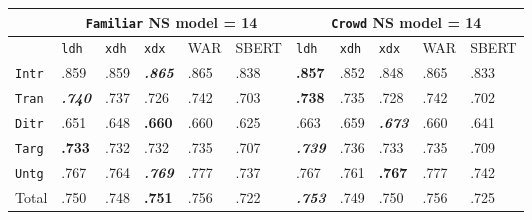 \documentclass[xcolor={dvipsnames}]{beamer}
\newcommand{\feat}[1]{\textsc{#1}}
\newcommand{\param}[1]{\texttt{#1}}
\begin{document}
\begin{frame}
\small
\begin{table}[htb!]
\begin{center}
\setlength{\tabcolsep}{.35em}
\begin{tabular}{|l||l|l|l||l|l||l|l|l||l|l|}
\hline
 & \multicolumn{5}{c||}{\param{Fam\-il\-iar} NS model = 14} & \multicolumn{5}{c|}{\param{Crowd} NS model = 14} \\
\hline
    		& \param{ldh}	& \param{xdh} &	\param{xdx} & WAR	& {\scriptsize SBERT} & \param{ldh}	& \param{xdh} &	\param{xdx} & WAR	& {\scriptsize SBERT} \\ \hline
\hline
\param{Intr}  & .859                   & .859 & \textit{\textbf{.865}} & .865 & .838 & \textbf{.857}          & .852 & .848                   & .865 & .833 \\ \hline
\param{Tran}  & \textit{\textbf{.740}} & .737 & .726                   & .742 & .703 & \textbf{.738}          & .735 & .728                   & .742 & .702 \\ \hline
\param{Ditr}  & .651                   & .648 & \textbf{.660}          & .660 & .625 & .663                   & .659 & \textit{\textbf{.673}} &  .660 & .641 \\ \hline
\hline
\param{Targ}  & \textbf{.733}          & .732 & .732                   & .735 & .707 & \textit{\textbf{.739}} & .736 & .733                   & .735 & .709 \\ \hline
\param{Untg}  & .767                   & .764 & \textit{\textbf{.769}} & .777 & .737 & .767          & .761 & \textbf{.767}          & .777 & .742 \\ \hline
\hline
Total & .750                   & .748 & \textbf{.751}          & .756 & .722 & \textit{\textbf{.753}} & .749 & .750                   & .756 & .725 \\ \hline
\end{tabular}


\end{center}
\end{table}
\end{frame}
\end{document}
